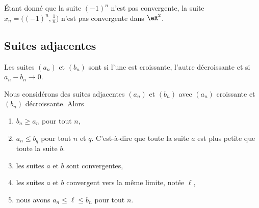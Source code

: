 \begin{example}
	Étant donné que la suite \( (-1)^n\) n'est pas convergente, la suite \( x_n=\big( (-1)^n,\frac{1}{ n } \big)\) n'est pas convergente dans \( \eR^2\).
\end{example}

\subsection{Suites adjacentes}

\begin{definition}         \label{DEFooDMZLooDtNPmu}
	Les suites \( (a_n)\) et \( (b_n)\) sont  si l'une est croissante, l'autre décroissante et si \( a_n-b_n\to 0\).
\end{definition}

\begin{theorem}   \label{THOooZJWLooAtGMxD}
	Nous considérons des suites adjacentes \( (a_n)\) et \( (b_n)\) avec \( (a_n)\) croissante et \( (b_n)\) décroissante. Alors
	\begin{enumerate}
		\item
		      \( b_n\geq a_n\) pour tout \( n\),
		\item
		      \( a_n\leq b_q\) pour tout \( n\) et \( q\). C'est-à-dire que toute la suite \( a\) est plus petite que toute la suite \( b\).
		\item
		      les suites \( a\) et \( b\) sont convergentes,
		\item
		      les suites \( a\) et \( b\) convergent vers la même limite, notée \( \ell\),
		\item
		      nous avons \( a_n\leq \ell\leq b_n\) pour tout \( n\).
	\end{enumerate}
\end{theorem}

